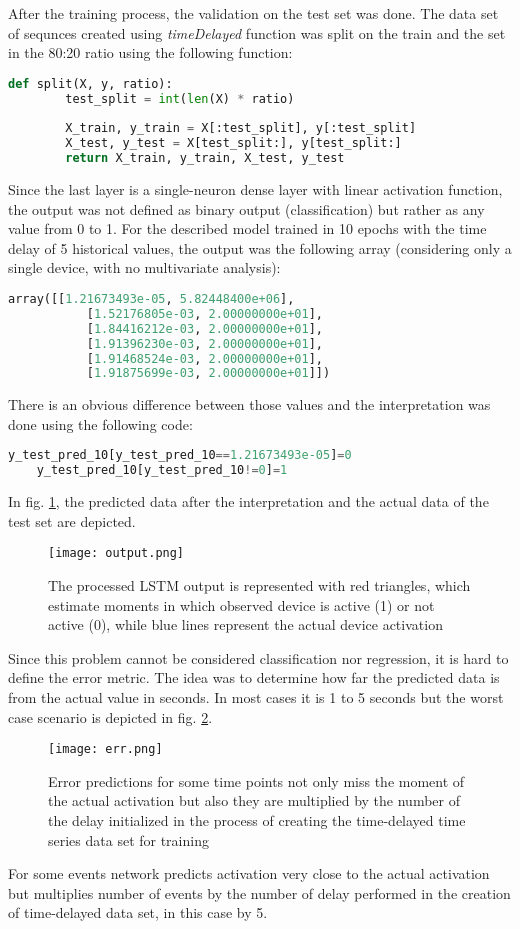 After the training process, the validation on the test set was done.
The data set of sequnces created using \textit{timeDelayed} function was split on the train and the set in the 80:20 ratio using the following function:
\begin{lstlisting}[language=Python]
    def split(X, y, ratio):    
        test_split = int(len(X) * ratio)
        
        X_train, y_train = X[:test_split], y[:test_split]
        X_test, y_test = X[test_split:], y[test_split:]
        return X_train, y_train, X_test, y_test
\end{lstlisting}
Since the last layer is a single-neuron dense layer with linear activation function, the output was not defined as binary output (classification) but rather as any value from 0 to 1.
For the described model trained in 10 epochs with the time delay of 5 historical values, the output was the following array (considering only a single device, with no multivariate analysis):
\begin{lstlisting}[language=Python]
    array([[1.21673493e-05, 5.82448400e+06],
           [1.52176805e-03, 2.00000000e+01],
           [1.84416212e-03, 2.00000000e+01],
           [1.91396230e-03, 2.00000000e+01],
           [1.91468524e-03, 2.00000000e+01],
           [1.91875699e-03, 2.00000000e+01]])
\end{lstlisting}
There is an obvious difference between those values and the interpretation was done using the following code:
\begin{lstlisting}[language=Python]
    y_test_pred_10[y_test_pred_10==1.21673493e-05]=0
    y_test_pred_10[y_test_pred_10!=0]=1
\end{lstlisting}
In fig. \ref{fig:output}, the predicted data after the interpretation and the actual data of the test set are depicted.
\begin{figure}[h]
    \centering
    \texttt{[image: output.png]}
    \caption{The processed LSTM output is represented with red triangles, which estimate moments in which observed device is active (1) or not active (0), while blue lines represent the actual device activation}
    \label{fig:output}
\end{figure}

Since this problem cannot be considered classification nor regression, it is hard to define the error metric.
The idea was to determine how far the predicted data is from the actual value in seconds.
In most cases it is 1 to 5 seconds but the worst case scenario is depicted in fig. \ref{fig:err}.
\begin{figure}[h]
    \centering
    \texttt{[image: err.png]}
    \caption{Error predictions for some time points not only miss the moment of the actual activation but also they are multiplied by the number of the delay initialized in the process of creating the time-delayed time series data set for training}
    \label{fig:err}
\end{figure}
For some events network predicts activation very close to the actual activation but multiplies number of events by the number of delay performed in the creation of time-delayed data set, in this case by 5.

